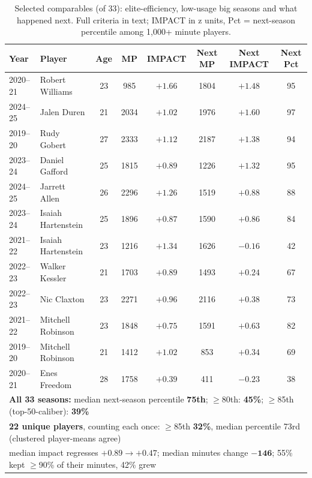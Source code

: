 \documentclass[11pt]{article}
\begin{document}
\begin{table}[h]
\centering\small
\caption{Selected comparables (of 33): elite-efficiency, low-usage big seasons and what
happened next. Full criteria in text; IMPACT in z units, Pct = next-season percentile
among 1{,}000+ minute players.}
\begin{tabular}{llcccccc}
\toprule
Year & Player & Age & MP & IMPACT & Next MP & Next IMPACT & Next Pct \\
\midrule
2020--21 & Robert Williams & 23 & 985 & $+1.66$ & 1804 & $+1.48$ & 95 \\
2024--25 & Jalen Duren & 21 & 2034 & $+1.02$ & 1976 & $+1.60$ & 97 \\
2019--20 & Rudy Gobert & 27 & 2333 & $+1.12$ & 2187 & $+1.38$ & 94 \\
2023--24 & Daniel Gafford & 25 & 1815 & $+0.89$ & 1226 & $+1.32$ & 95 \\
2024--25 & Jarrett Allen & 26 & 2296 & $+1.26$ & 1519 & $+0.88$ & 88 \\
2023--24 & Isaiah Hartenstein & 25 & 1896 & $+0.87$ & 1590 & $+0.86$ & 84 \\
2021--22 & Isaiah Hartenstein & 23 & 1216 & $+1.34$ & 1626 & $-0.16$ & 42 \\
2022--23 & Walker Kessler & 21 & 1703 & $+0.89$ & 1493 & $+0.24$ & 67 \\
2022--23 & Nic Claxton & 23 & 2271 & $+0.96$ & 2116 & $+0.38$ & 73 \\
2021--22 & Mitchell Robinson & 23 & 1848 & $+0.75$ & 1591 & $+0.63$ & 82 \\
2019--20 & Mitchell Robinson & 21 & 1412 & $+1.02$ & 853 & $+0.34$ & 69 \\
2020--21 & Enes Freedom & 28 & 1758 & $+0.39$ & 411 & $-0.23$ & 38 \\
\midrule
\multicolumn{8}{l}{\textbf{All 33 seasons:} median next-season percentile \textbf{75th};
$\ge$80th: \textbf{45\%}; $\ge$85th (top-50-caliber): \textbf{39\%}} \\
\multicolumn{8}{l}{\textbf{22 unique players}, counting each once: $\ge$85th
\textbf{32\%}, median percentile 73rd (clustered player-means agree)} \\
\multicolumn{8}{l}{median impact regresses $+0.89 \to +0.47$; median minutes change
$\mathbf{-146}$; 55\% kept $\ge$90\% of their minutes, 42\% grew} \\
\bottomrule
\end{tabular}
\label{tab:comps}
\end{table}
\end{document}
